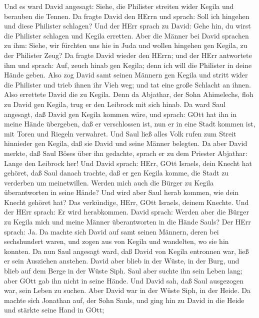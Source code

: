  Und es ward David angesagt: Siehe, die Philister streiten
wider Kegila und berauben die Tennen.  Da fragte David den
HErrn und sprach: Soll ich hingehen und diese Philister schlagen? Und
der HErr sprach zu David: Gehe hin, du wirst die Philister schlagen und
Kegila erretten.  Aber die Männer bei David sprachen zu ihm:
Siehe, wir fürchten uns hie in Juda und wollen hingehen gen Kegila, zu
der Philister Zeug?  Da fragte David wieder den HErrn; und
der HErr antwortete ihm und sprach: Auf, zeuch hinab gen Kegila; denn
ich will die Philister in deine Hände geben.  Also zog David
samt seinen Männern gen Kegila und stritt wider die Philister und trieb
ihnen ihr Vieh weg; und tat eine große Schlacht an ihnen. Also errettete
David die zu Kegila.  Denn da Abjathar, der Sohn Ahimelechs,
floh zu David gen Kegila, trug er den Leibrock mit sich hinab.
 Da ward Saul angesagt, daß David gen Kegila kommen wäre,
und sprach: GOtt hat ihn in meine Hände übergeben, daß er verschlossen
ist, nun er in eine Stadt kommen ist, mit Toren und Riegeln verwahret.
 Und Saul ließ alles Volk rufen zum Streit hinnieder gen
Kegila, daß sie David und seine Männer belegten.  Da aber
David merkte, daß Saul Böses über ihn gedachte, sprach er zu dem
Priester Abjathar: Lange den Leibrock her!  Und David
sprach: HErr, GOtt Israels, dein Knecht hat gehöret, daß Saul danach
trachte, daß er gen Kegila komme, die Stadt zu verderben um
meinetwillen.  Werden mich auch die Bürger zu Kegila
überantworten in seine Hände? Und wird aber Saul herab kommen, wie dein
Knecht gehöret hat? Das verkündige, HErr, GOtt Israels, deinem Knechte.
Und der HErr sprach: Er wird herabkommen.  David sprach:
Werden aber die Bürger zu Kegila mich und meine Männer überantworten in
die Hände Sauls? Der HErr sprach: Ja.  Da machte sich David
auf samt seinen Männern, deren bei sechshundert waren, und zogen aus von
Kegila und wandelten, wo sie hin konnten. Da nun Saul angesagt ward, daß
David von Kegila entronnen war, ließ er sein Ausziehen anstehen.
 David aber blieb in der Wüste, in der Burg, und blieb auf
dem Berge in der Wüste Siph. Saul aber suchte ihn sein Leben lang; aber
GOtt gab ihn nicht in seine Hände.  Und David sah, daß Saul
ausgezogen war, sein Leben zu suchen. Aber David war in der Wüste Siph,
in der Heide.  Da machte sich Jonathan auf, der Sohn Sauls,
und ging hin zu David in die Heide und stärkte seine Hand in GOtt;
